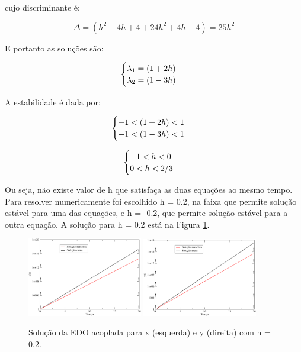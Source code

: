 \documentclass[a4wide]{report}
\begin{document}
cujo discriminante é:

\begin{equation*}
\Delta = (h^2 -4h + 4 + 24h^2 + 4h -4) = 25h^2
\end{equation*}

E portanto as soluções são:

\begin{equation}
\begin{cases} 
$$\lambda_1 = (1+2h) \\ 
\lambda_2   = (1-3h)  $
$\end{cases}
\end{equation}

A estabilidade é dada por:

\begin{equation}
\begin{cases} 
-1 < (1+2h) < 1 \\ 
-1 < (1-3h) < 1  $
$\end{cases}
\end{equation}

\begin{equation}
\begin{cases} 
-1 < h < 0 \\ 
 0 <  h < 2/3  $
$\end{cases}
\end{equation}

Ou seja, não existe valor de h que satisfaça as duas equações ao mesmo tempo. Para resolver numericamente foi escolhido h = 0.2, na faixa que permite solução estável para uma das equações, e h = -0.2, que permite solução estável para a outra equação. A solução para h = 0.2 está na Figura \ref{2}.


\begin{figure}[!htb]
\centering
\includegraphics[width=0.447\textwidth]{x.pdf}
\includegraphics[width=0.447\textwidth]{y.pdf}
\caption{ Solução da EDO acoplada para x (esquerda) e y (direita) com h = 0.2.  }
\label{2}
\end{figure}
\end{document}
